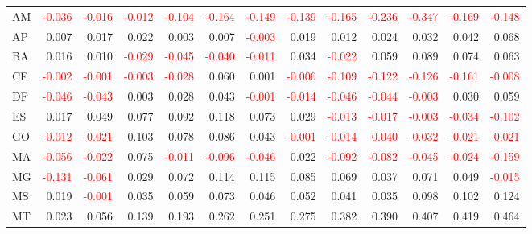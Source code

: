 \begin{table}[!htb]
{\begin{tabular}{lrrrrrrrrrrrr}
      AM & \textcolor{red}{-0.036} & \textcolor{red}{-0.016} & \textcolor{red}{-0.012} & \textcolor{red}{-0.104} & \textcolor{red}{-0.164} & \textcolor{red}{-0.149} & \textcolor{red}{-0.139} & \textcolor{red}{-0.165} & \textcolor{red}{-0.236} & \textcolor{red}{-0.347} & \textcolor{red}{-0.169} & \textcolor{red}{-0.148} \\
      AP & 0.007 & 0.017 & 0.022 & 0.003 & 0.007 & \textcolor{red}{-0.003} & 0.019 & 0.012 & 0.024 & 0.032 & 0.042 & 0.068 \\
      BA & 0.016 & 0.010 & \textcolor{red}{-0.029} & \textcolor{red}{-0.045} & \textcolor{red}{-0.040} & \textcolor{red}{-0.011} & 0.034 & \textcolor{red}{-0.022} & 0.059 & 0.089 & 0.074 & 0.063 \\
      CE & \textcolor{red}{-0.002} & \textcolor{red}{-0.001} & \textcolor{red}{-0.003} & \textcolor{red}{-0.028} & 0.060 & 0.001 & \textcolor{red}{-0.006} & \textcolor{red}{-0.109} & \textcolor{red}{-0.122} & \textcolor{red}{-0.126} & \textcolor{red}{-0.161} & \textcolor{red}{-0.008} \\
      DF & \textcolor{red}{-0.046} & \textcolor{red}{-0.043} & 0.003 & 0.028 & 0.043 & \textcolor{red}{-0.001} & \textcolor{red}{-0.014} & \textcolor{red}{-0.046} & \textcolor{red}{-0.044} & \textcolor{red}{-0.003} & 0.030 & 0.059 \\
      ES & 0.017 & 0.049 & 0.077 & 0.092 & 0.118 & 0.073 & 0.029 & \textcolor{red}{-0.013} & \textcolor{red}{-0.017} & \textcolor{red}{-0.003} & \textcolor{red}{-0.034} & \textcolor{red}{-0.102} \\
      GO & \textcolor{red}{-0.012} & \textcolor{red}{-0.021} & 0.103 & 0.078 & 0.086 & 0.043 & \textcolor{red}{-0.001} & \textcolor{red}{-0.014} & \textcolor{red}{-0.040} & \textcolor{red}{-0.032} & \textcolor{red}{-0.021} & \textcolor{red}{-0.021} \\
      MA & \textcolor{red}{-0.056} & \textcolor{red}{-0.022} & 0.075 & \textcolor{red}{-0.011} & \textcolor{red}{-0.096} & \textcolor{red}{-0.046} & 0.022 & \textcolor{red}{-0.092} & \textcolor{red}{-0.082} & \textcolor{red}{-0.045} & \textcolor{red}{-0.024} & \textcolor{red}{-0.159} \\
      MG & \textcolor{red}{-0.131} & \textcolor{red}{-0.061} & 0.029 & 0.072 & 0.114 & 0.115 & 0.085 & 0.069 & 0.037 & 0.071 & 0.049 & \textcolor{red}{-0.015} \\
      MS & 0.019 & \textcolor{red}{-0.001} & 0.035 & 0.059 & 0.073 & 0.046 & 0.052 & 0.041 & 0.035 & 0.098 & 0.102 & 0.124 \\
      MT & 0.023 & 0.056 & 0.139 & 0.193 & 0.262 & 0.251 & 0.275 & 0.382 & 0.390 & 0.407 & 0.419 & 0.464 \\

\end{tabular}}
\end{table}
